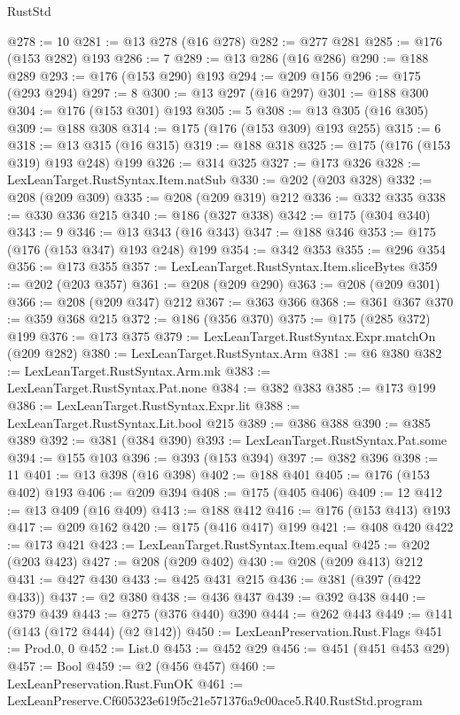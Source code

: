 \begin{lexlean}{RustStd}
\begin{coremodule}
@278 := 10
@281 := @13 @278 (@16 @278)
@282 := @277 @281
@285 := @176 (@153 @282) @193
@286 := 7
@289 := @13 @286 (@16 @286)
@290 := @188 @289
@293 := @176 (@153 @290) @193
@294 := @209 @156
@296 := @175 (@293 @294)
@297 := 8
@300 := @13 @297 (@16 @297)
@301 := @188 @300
@304 := @176 (@153 @301) @193
@305 := 5
@308 := @13 @305 (@16 @305)
@309 := @188 @308
@314 := @175 (@176 (@153 @309) @193 @255)
@315 := 6
@318 := @13 @315 (@16 @315)
@319 := @188 @318
@325 := @175 (@176 (@153 @319) @193 @248) @199
@326 := @314 @325
@327 := @173 @326
@328 := LexLeanTarget.RustSyntax.Item.natSub
@330 := @202 (@203 @328)
@332 := @208 (@209 @309)
@335 := @208 (@209 @319) @212
@336 := @332 @335
@338 := @330 @336 @215
@340 := @186 (@327 @338)
@342 := @175 (@304 @340)
@343 := 9
@346 := @13 @343 (@16 @343)
@347 := @188 @346
@353 := @175 (@176 (@153 @347) @193 @248) @199
@354 := @342 @353
@355 := @296 @354
@356 := @173 @355
@357 := LexLeanTarget.RustSyntax.Item.sliceBytes
@359 := @202 (@203 @357)
@361 := @208 (@209 @290)
@363 := @208 (@209 @301)
@366 := @208 (@209 @347) @212
@367 := @363 @366
@368 := @361 @367
@370 := @359 @368 @215
@372 := @186 (@356 @370)
@375 := @175 (@285 @372) @199
@376 := @173 @375
@379 := LexLeanTarget.RustSyntax.Expr.matchOn (@209 @282)
@380 := LexLeanTarget.RustSyntax.Arm
@381 := @6 @380
@382 := LexLeanTarget.RustSyntax.Arm.mk
@383 := LexLeanTarget.RustSyntax.Pat.none
@384 := @382 @383
@385 := @173 @199
@386 := LexLeanTarget.RustSyntax.Expr.lit
@388 := LexLeanTarget.RustSyntax.Lit.bool @215
@389 := @386 @388
@390 := @385 @389
@392 := @381 (@384 @390)
@393 := LexLeanTarget.RustSyntax.Pat.some
@394 := @155 @103
@396 := @393 (@153 @394)
@397 := @382 @396
@398 := 11
@401 := @13 @398 (@16 @398)
@402 := @188 @401
@405 := @176 (@153 @402) @193
@406 := @209 @394
@408 := @175 (@405 @406)
@409 := 12
@412 := @13 @409 (@16 @409)
@413 := @188 @412
@416 := @176 (@153 @413) @193
@417 := @209 @162
@420 := @175 (@416 @417) @199
@421 := @408 @420
@422 := @173 @421
@423 := LexLeanTarget.RustSyntax.Item.equal
@425 := @202 (@203 @423)
@427 := @208 (@209 @402)
@430 := @208 (@209 @413) @212
@431 := @427 @430
@433 := @425 @431 @215
@436 := @381 (@397 (@422 @433))
@437 := @2 @380
@438 := @436 @437
@439 := @392 @438
@440 := @379 @439
@443 := @275 (@376 @440) @390
@444 := @262 @443
@449 := @141 (@143 (@172 @444) (@2 @142))
@450 := LexLeanPreservation.Rust.Flags
@451 := Prod.{0, 0}
@452 := List.{0}
@453 := @452 @29
@456 := @451 (@451 @453 @29)
@457 := Bool
@459 := @2 (@456 @457)
@460 := LexLeanPreservation.Rust.FunOK
@461 := LexLeanPreserve.Cf605323e619f5c21e571376a9c00ace5.R40.RustStd.program

\end{coremodule}
\end{lexlean}

